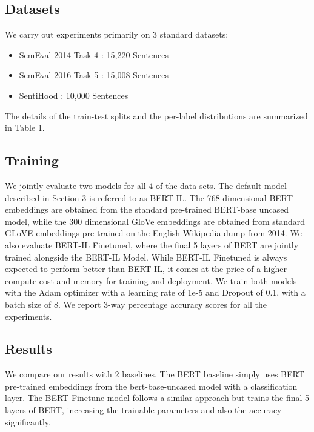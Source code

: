 \documentclass[11pt,a4paper]{article}
\begin{document}
\subsection{Datasets}



We carry out experiments primarily on 3 standard datasets:

\begin{itemize}
    \item SemEval 2014 Task 4 \cite{pontiki-etal-2014-semeval}: 15,220 Sentences  
    \item SemEval 2016 Task 5 \cite{pontiki-etal-2016-semeval}: 15,008 Sentences
    \item SentiHood \cite{saeidi-etal-2016-sentihood}: 10,000 Sentences


\end{itemize}

The details of the train-test splits and the per-label distributions are summarized in Table 1. 
 \subsection{Training}
 
 We jointly evaluate two models for all 4 of the data sets. The default model described in Section 3 is referred to as BERT-IL. The 768 dimensional BERT embeddings are obtained from the standard pre-trained BERT-base uncased model, while the 300 dimensional GloVe embeddings are obtained from standard GLoVE embeddings pre-trained on the English Wikipedia dump from 2014. We also evaluate BERT-IL Finetuned, where the final 5 layers of BERT are jointly trained alongside the BERT-IL Model. While BERT-IL Finetuned is always expected to perform better than BERT-IL, it comes at the price of a higher compute cost and memory for training and deployment. We train both models with the Adam optimizer with a learning rate of 1e-5 and Dropout of 0.1, with a batch size of 8. We report 3-way percentage accuracy scores for all the experiments.
 

\subsection{Results}

We compare our results with 2 baselines. The BERT baseline simply uses BERT pre-trained embeddings from the bert-base-uncased model with a classification layer. The BERT-Finetune model follows a similar approach but trains the final 5 layers of BERT, increasing the trainable parameters and also the accuracy significantly. 
\end{document}
